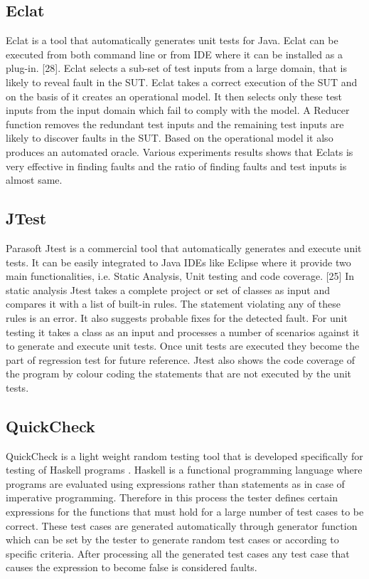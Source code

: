 \subsection{Eclat}
Eclat \cite{Pacheco2005} is a tool that automatically generates unit tests for Java. Eclat can be executed from both command line or from IDE where it can be installed as a plug-in. [28]. Eclat selects a sub-set of test inputs from a large domain, that is likely to reveal fault in the SUT. Eclat takes a correct execution of the SUT and on the basis of it creates an operational model. It then selects only these test inputs from the input domain which fail to comply with the model. A Reducer function removes the redundant test inputs and the remaining test inputs are likely to discover faults in the SUT. Based on the operational model it also produces an automated oracle. Various experiments results shows that Eclats is very effective in finding faults and the ratio of finding faults and test inputs is almost same.

\subsection{JTest}
Parasoft Jtest is a commercial tool that automatically generates and execute unit tests. It can be easily integrated to Java IDEs like Eclipse where it provide two main functionalities, i.e. Static Analysis, Unit testing and code coverage. [25]
In static analysis Jtest takes a complete project or set of classes as input and compares it with a list of built-in rules. The statement violating any of these rules is an error. It also suggests probable fixes for the detected fault.
For unit testing it takes a class as an input and processes a number of scenarios against it to generate and execute unit tests. Once unit tests are executed they become the part of regression test for future reference.
Jtest also shows the code coverage of the program by colour coding the statements that are not executed by the unit tests.

\subsection{QuickCheck}
QuickCheck \cite{Claessen2000} is a light weight random testing tool that is developed specifically for testing of Haskell programs \cite{Hudak2007}. Haskell is a functional programming language where programs are evaluated using expressions rather than statements as in case of imperative programming. Therefore in this process the tester defines certain expressions for the functions that must hold for a large number of test cases to be correct. These test cases are generated automatically through generator function which can be set by the tester to generate random test cases or according to specific criteria. After processing all the generated test cases any test case that causes the expression to become false is considered faults.

